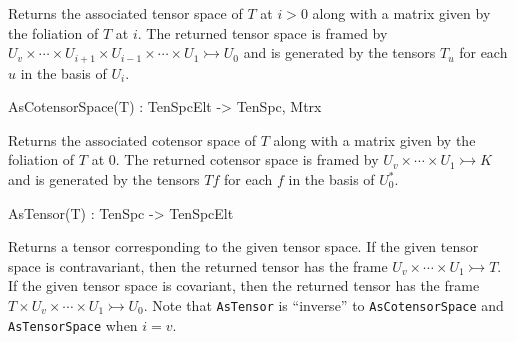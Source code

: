 Returns the associated tensor space of $T$ at $i>0$ along with a matrix given by
the foliation of $T$ at $i$. 
The returned tensor space is framed by 
$U_v\times \cdots \times U_{i+1}\times U_{i-1}\times \cdots \times U_1\rightarrowtail U_0$
and is generated by the tensors $T_u$ for each $u$ in the basis of $U_i$.

\begin{intrinsics}
AsCotensorSpace(T) : TenSpcElt -> TenSpc, Mtrx
\end{intrinsics}

Returns the associated cotensor space of $T$ along with a matrix given by
the foliation of $T$ at $0$. 
The returned cotensor space is framed by 
$U_v\times \cdots \times U_1\rightarrowtail K$
and is generated by the tensors $Tf$ for each $f$ in the basis of $U_0^*$.

\begin{intrinsics}
AsTensor(T) : TenSpc -> TenSpcElt
\end{intrinsics}

Returns a tensor corresponding to the given tensor space. 
If the given tensor space is contravariant, then the returned tensor has the frame $U_v\times \cdots \times U_1\rightarrowtail T$.
If the given tensor space is covariant, then the returned tensor has the frame $T\times U_v\times \cdots \times U_1\rightarrowtail U_0$.
Note that {\tt AsTensor} is ``inverse'' to {\tt AsCotensorSpace} and {\tt AsTensorSpace} when $i=v$.

